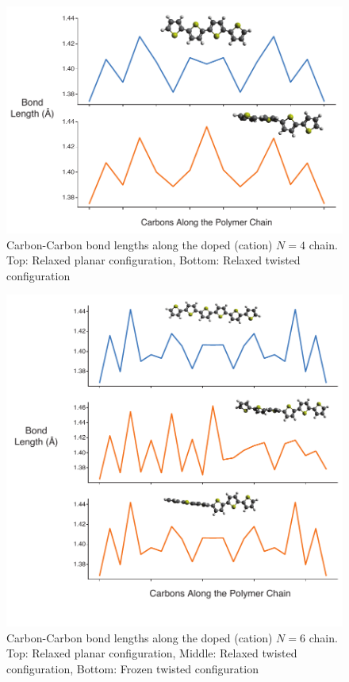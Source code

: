 \begin{figure}[hbt!]
    \centering
    \includegraphics{figures/append_tor_model/n4_fig_w.pdf}
    \caption{Carbon-Carbon bond lengths along the doped (cation) $N = 4$ chain. Top: Relaxed planar configuration, Bottom: Relaxed twisted configuration}
    \label{fig:n4_bl}
\end{figure}

\begin{figure}[hbt!]
    \centering
    \includegraphics{figures/append_tor_model/n6_fig_w.pdf}
    \caption{Carbon-Carbon bond lengths along the doped (cation) $N = 6$ chain. Top: Relaxed planar configuration, Middle: Relaxed twisted configuration, Bottom: Frozen twisted configuration}
    \label{fig:n6_bl}
\end{figure}

